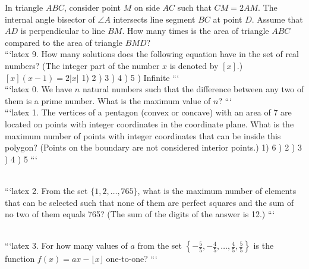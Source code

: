 In triangle $ABC$, consider point $M$ on side $AC$ such that $CM = 2AM$. The internal angle bisector of $\angle A$ intersects line segment $BC$ at point $D$. Assume that $AD$ is perpendicular to line $BM$. How many times is the area of triangle $ABC$ compared to the area of triangle $BMD$?
\\
```latex
9. How many solutions does the following equation have in the set of real numbers? (The integer part of the number $x$ is denoted by $[x]$.)  
$[x](x-1)=2|x|$  
1) 2 ) 3 ) 4 ) 5 ) Infinite
```
\\
```latex
0. We have $n$ natural numbers such that the difference between any two of them is a prime number. What is the maximum value of $n$?
```
\\
```latex
1. The vertices of a pentagon (convex or concave) with an area of 7 are located on points with integer coordinates in the coordinate plane. What is the maximum number of points with integer coordinates that can be inside this polygon? (Points on the boundary are not considered interior points.)
1) 6 ) 2 ) 3 ) 4 ) 5
```

\\
```latex
2. From the set $\{1, 2, \ldots, 765\}$, what is the maximum number of elements that can be selected such that none of them are perfect squares and the sum of no two of them equals 765? (The sum of the digits of the answer is 12.)
```

\\
```latex
3. For how many values of $a$ from the set $\left\{-\frac{5}{5}, -\frac{4}{5}, \ldots, \frac{4}{5}, \frac{5}{5}\right\}$ is the function $f(x) = ax - \lfloor x \rfloor$ one-to-one?
```

